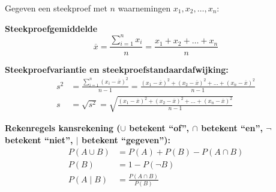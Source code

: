 Gegeven een steekproef met $n$ waarnemingen $x_1, x_2, \ldots, x_n$:

\textbf{Steekproefgemiddelde}
\[
    \overline{x} = \frac{\sum_{i=1}^n x_i}{n} = \frac{x_1 + x_2 + \ldots + x_n}{n}
\]

\textbf{Steekproefvariantie en steekproefstandaardafwijking:}
\begin{align*}
    s^2 &= \frac{\sum_{i=1}^{n} (x_i-\overline{x})^2}{n-1} = \frac{(x_1-\overline{x})^2 + (x_2-\overline{x})^2 + \ldots + (x_n - \overline{x})^2}{n-1} \\[1ex]
    s   &= \sqrt{s^2} = \sqrt{ \frac{(x_1-\overline{x})^2 + (x_2-\overline{x})^2 + \ldots + (x_n - \overline{x})^2}{n-1} }
\end{align*}

\textbf{Rekenregels kansrekening ($\cup$ betekent \enquote{of}, $\cap$ betekent \enquote{en}, $\neg$ betekent \enquote{niet}, $\vert$ betekent \enquote{gegeven}):}
{
    \addtolength{\jot}{1em}
    \begin{align*}
        P(A \cup B)  &= P(A) + P(B) - P(A \cap B) \tag{optelregel} \\
        P(B)                &= 1 - P(\neg B) \tag{complementregel} \\
        P(A \mid B)         &= \frac{P(A \cap B)}{P(B)} \tag{conditionele kansen}
    \end{align*}
}

